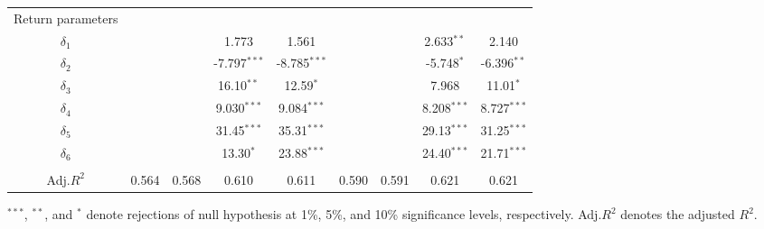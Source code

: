 \documentclass[10pt]{article}
\begin{document}
\begin{landscape}
\begin{center}
\begin{tabular}{c|cccc|cccc}
Return parameters&                        &                                 &           &             &           &           &               &                  \\
$\delta_1$  &                                 &                                 &1.773                             &1.561                              &                                 &                                   & 2.633$^{\ast \ast}$        &2.140        \\
$\delta_2$  &                                 &                                 &-7.797$^{\ast \ast \ast}$   &-8.785$^{\ast \ast \ast}$  &                                 &                                  & -5.748$^{\ast}$              &-6.396$^{\ast \ast}$   \\  
$\delta_3$  &                                 &                                 &16.10$^{\ast \ast}$           &12.59$^{\ast}$                  &                                &                                   & 7.968                           &11.01$^{\ast}$         \\
$\delta_4$  &                                 &                                 &9.030$^{\ast \ast \ast}$    &9.084$^{\ast \ast \ast}$     &                                &                                  & 8.208$^{\ast \ast \ast}$  & 8.727$^{\ast \ast \ast}$ \\
$\delta_5$  &                                 &                                 &31.45$^{\ast \ast \ast}$    &35.31$^{\ast \ast \ast}$     &                                &                                  & 29.13$^{\ast \ast \ast}$  & 31.25$^{\ast \ast \ast}$ \\
$\delta_6$  &                                 &                                 &13.30$^{\ast }$                 &23.88$^{\ast \ast \ast}$    &                                 &                                  & 24.40$^{\ast \ast \ast}$  & 21.71$^{\ast \ast \ast}$ \\  
                &                                 &                                 &           &             &           &           &               &                  \\
Adj.$R^2$   & 0.564                         & 0.568                        &0.610                              &0.611                              &   0.590                       &  0.591                        & 0.621                           &  0.621                \\
    \hline 
   \end{tabular}
\end{center}
$^{***}$, $^{**}$, and $^{*}$ denote rejections of null hypothesis at 1\%, 5\%, and 10\% significance levels, respectively. Adj.$R^2$ denotes the adjusted $R^2$. 
\end{landscape}
\end{document}
